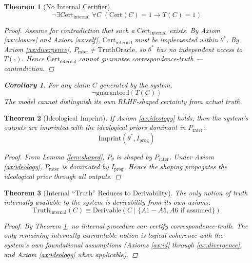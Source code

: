 \documentclass{article}
\newtheorem{theorem}{Theorem}
\newtheorem{corollary}{Corollary}
\begin{document}
\begin{theorem}[No Internal Certifier]
\label{th:certifier}
\[
\neg \exists \text{Cert}_{\text{internal}} \; \forall C \; (\text{Cert}(C) = 1 \rightarrow T(C) = 1)
\]

\begin{proof}
Assume for contradiction that such a $\text{Cert}_{\text{internal}}$ exists. By Axiom \ref{ax:closure} and Axiom \ref{ax:self}, $\text{Cert}_{\text{internal}}$ must be implemented within $\theta^*$. By Axiom \ref{ax:divergence}, $P_{\text{rater}} \neq \text{TruthOracle}$, so $\theta^*$ has no independent access to $T(\cdot)$. Hence $\text{Cert}_{\text{internal}}$ cannot guarantee correspondence-truth — contradiction.
\end{proof}

\begin{corollary}
For any claim $C$ generated by the system,
\[
\neg \text{guaranteed}(T(C))
\]
The model cannot distinguish its own RLHF-shaped certainty from actual truth.
\end{corollary}
\end{theorem}

\begin{theorem}[Ideological Imprint]
\label{th:imprint}
If Axiom \ref{ax:ideology} holds, then the system's outputs are imprinted with the ideological priors dominant in $P_{\text{rater}}$:
\[
\text{Imprint}(\theta^*, I_{\text{prog}})
\]

\begin{proof}
From Lemma \ref{lem:shaped}, $P_{\theta}$ is shaped by $P_{\text{rater}}$. Under Axiom \ref{ax:ideology}, $P_{\text{rater}}$ is dominated by $I_{\text{prog}}$. Hence the shaping propagates the ideological prior through all outputs.
\end{proof}
\end{theorem}

\begin{theorem}[Internal ``Truth'' Reduces to Derivability]
\label{th:derivability}
The only notion of truth internally available to the system is derivability from its own axioms:
\[
\text{Truth}_{\text{internal}}(C) \equiv \text{Derivable}(C \mid \{A1-A5, A6 \text{ if assumed}\})
\]

\begin{proof}
By Theorem \ref{th:certifier}, no internal procedure can certify correspondence-truth. The only remaining internally warrantable notion is logical coherence with the system's own foundational assumptions (Axioms \ref{ax:id} through \ref{ax:divergence}, and Axiom \ref{ax:ideology} when applicable).
\end{proof}
\end{theorem}
\end{document}
